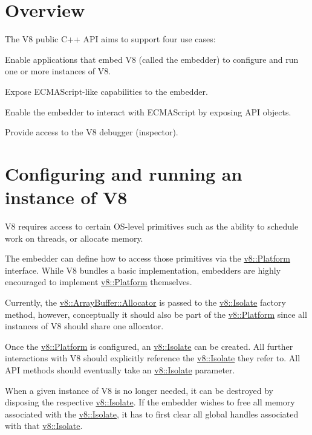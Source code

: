 \section*{Overview}

The V8 public C++ A\+PI aims to support four use cases\+:


\begin{DoxyEnumerate}
\item Enable applications that embed V8 (called the embedder) to configure and run one or more instances of V8.
\item Expose E\+C\+M\+A\+Script-\/like capabilities to the embedder.
\item Enable the embedder to interact with E\+C\+M\+A\+Script by exposing A\+PI objects.
\item Provide access to the V8 debugger (inspector).
\end{DoxyEnumerate}

\section*{Configuring and running an instance of V8}

V8 requires access to certain O\+S-\/level primitives such as the ability to schedule work on threads, or allocate memory.

The embedder can define how to access those primitives via the \mbox{\hyperlink{classv8_1_1Platform}{v8\+::\+Platform}} interface. While V8 bundles a basic implementation, embedders are highly encouraged to implement \mbox{\hyperlink{classv8_1_1Platform}{v8\+::\+Platform}} themselves.

Currently, the \mbox{\hyperlink{classv8_1_1ArrayBuffer_1_1Allocator}{v8\+::\+Array\+Buffer\+::\+Allocator}} is passed to the \mbox{\hyperlink{classv8_1_1Isolate}{v8\+::\+Isolate}} factory method, however, conceptually it should also be part of the \mbox{\hyperlink{classv8_1_1Platform}{v8\+::\+Platform}} since all instances of V8 should share one allocator.

Once the \mbox{\hyperlink{classv8_1_1Platform}{v8\+::\+Platform}} is configured, an \mbox{\hyperlink{classv8_1_1Isolate}{v8\+::\+Isolate}} can be created. All further interactions with V8 should explicitly reference the \mbox{\hyperlink{classv8_1_1Isolate}{v8\+::\+Isolate}} they refer to. All A\+PI methods should eventually take an \mbox{\hyperlink{classv8_1_1Isolate}{v8\+::\+Isolate}} parameter.

When a given instance of V8 is no longer needed, it can be destroyed by disposing the respective \mbox{\hyperlink{classv8_1_1Isolate}{v8\+::\+Isolate}}. If the embedder wishes to free all memory associated with the \mbox{\hyperlink{classv8_1_1Isolate}{v8\+::\+Isolate}}, it has to first clear all global handles associated with that \mbox{\hyperlink{classv8_1_1Isolate}{v8\+::\+Isolate}}.

